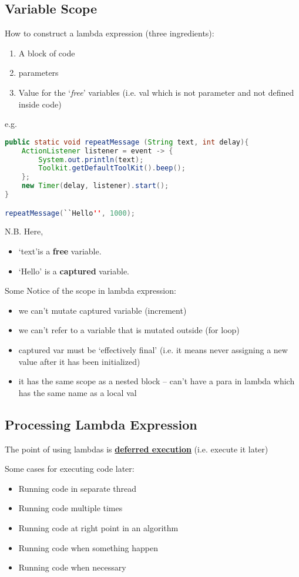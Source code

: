 \documentclass[12pt]{article}
\begin{document}
\subsection{Variable Scope}
How to construct a lambda expression (three ingredients):
\begin{enumerate}
    \item A block of code
    \item parameters
    \item Value for the `\emph{free}' variables (i.e. val which is not parameter and not defined inside code)
\end{enumerate}
e.g.
\begin{lstlisting}[language=Java]
public static void repeatMessage (String text, int delay){
    ActionListener listener = event -> {
        System.out.println(text);
        Toolkit.getDefaultToolKit().beep();
    };
    new Timer(delay, listener).start();
}

repeatMessage(``Hello'', 1000);
\end{lstlisting}
N.B. Here,
\begin{itemize}
    \item `text'is a \textbf{free} variable.
    \item `Hello' is a \textbf{captured} variable.
\end{itemize}

Some Notice of the scope in lambda expression:
\begin{itemize}
    \item we can't mutate captured variable (increment)
    \item we can't refer to a variable that is mutated outside (for loop)
    \item captured var must be `effectively final' \newline 
    (i.e. it means never assigning a new value after it has been initialized)
    \item it has the same scope as a nested block -- can't have a para in lambda which has the same name as a local val
\end{itemize}

\subsection{Processing Lambda Expression}
The point of using lambdas is \underline{\textbf{deferred execution}} (i.e. execute it later)

Some cases for executing code later:
\begin{itemize}
    \item Running code in separate thread
    \item Running code multiple times
    \item Running code at right point in an algorithm
    \item Running code when something happen
    \item Running code when necessary
\end{itemize}
\end{document}
